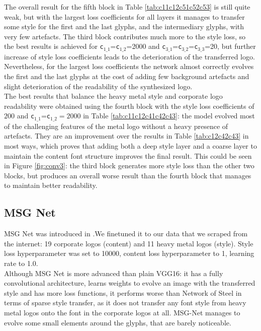 \documentclass[a4paper,twoside]{article}
\begin{document}
\noindent The overall result for the fifth block in Table \ref{tab:c11c12c51c52c53} is still quite weak, but with the largest loss coefficients for all layers it manages to transfer some style for the first and the last glyphs, and the intermediary glyphs, with very few artefacts. The third block contributes much more to the style loss, so the best results is achieved for \texttt{c$_{1\_1}$}=\texttt{c$_{1\_2}$}=2000 and \texttt{c$_{3\_1}$}=\texttt{c$_{3\_2}$}=\texttt{c$_{3\_3}$}=20, but further increase of style loss coefficients leads to the deterioration of the transferred logo. Nevertheless, for the largest loss coefficients the network almost correctly evolves the first and the last glyphs at the cost of adding few background artefacts and slight deterioration of the readability of the synthesized logo.\\

\noindent The best results that balance the heavy metal style and corporate logo readability were obtained using the fourth block with the style loss coefficients of $200$ and  \texttt{c$_{1\_1}$}=\texttt{c$_{1\_2}$}$=2000$ in Table \ref{tab:c11c12c41c42c43}: the model evolved most of the challenging features of the metal logo without a heavy presence of artefacts. They are an improvement over the results in Table \ref{tab:c12c42c43} in most ways, which proves that adding both a deep style layer and a coarse layer to maintain the content font structure improves the final result. This could be seen in Figure \ref{fig:conv3}: the third block generates more style loss than the other two blocks, but produces an overall worse result than the fourth block that manages to maintain better readability.  
\subsection{MSG Net} 
MSG Net was introduced in \cite{zhang2017multi}.We finetuned it to our data that we scraped from the internet: 19 corporate logos (content) and 11 heavy metal logos (style). Style loss hyperparameter was set to 10000, content loss hyperparameter to 1, learning rate to 1.0.\\

\noindent Although MSG Net is more advanced than plain VGG16: it has a fully convolutional architecture, learns weights to evolve an image with the transferred style and has more loss functions, it performs worse than Network of Steel in terms of sparse style transfer, as it does not transfer any font style from heavy metal logos onto the font in the corporate logos at all. MSG-Net manages to evolve some small elements around the glyphs, that are barely noticeable. 
\end{document}
